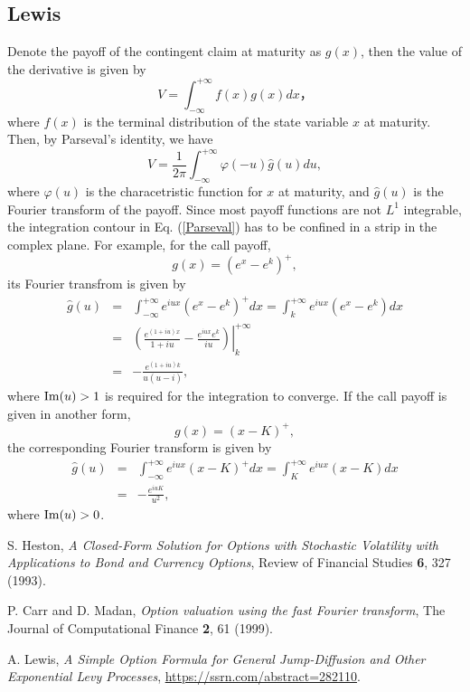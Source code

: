 \documentclass[12pt]{article}
\begin{document}
  \subsection{Lewis \cite{Lewis}}

    Denote the payoff of the contingent claim at maturity as $g(x)$, then the value of the derivative is given by
    \begin{equation}
      V = \int_{-\infty}^{+\infty}f(x)g(x)dx，
    \end{equation}
    where $f(x)$ is the terminal distribution of the state variable $x$ at maturity. Then, by Parseval's identity, we have
    \begin{equation}
      V = \frac{1}{2\pi}\int_{-\infty}^{+\infty}\varphi(-u)\hat{g}(u)du,
      \label{Parseval}
    \end{equation}
    where $\varphi(u)$ is the characetristic function for $x$ at maturity, and $\hat{g}(u)$ is the Fourier transform of
    the payoff. Since most payoff functions are not $L^1$ integrable, the integration contour in Eq. (\ref{Parseval}) has
    to be confined in a strip in the complex plane. For example, for the call payoff,
    \begin{equation}
      g(x)=\left(e^x-e^k\right)^+,
    \end{equation}
    its Fourier transfrom is given by
    \begin{eqnarray}
      \hat{g}(u) &=& \int_{-\infty}^{+\infty}e^{iux}\left(e^x-e^k\right)^+dx=\int_{k}^{+\infty}e^{iux}\left(e^x-e^k\right)dx \nonumber\\
                 &=& \left.\left(\frac{e^{(1+iu)x}}{1+iu}-\frac{e^{iux}e^k}{iu}\right)\right|_k^{+\infty}\nonumber\\
                 &=& -\frac{e^{(1+iu)k}}{u(u-i)},
    \end{eqnarray}
    where ${\rm Im}(u) > 1$ is required for the integration to converge. If the call payoff is given in another form,
    \begin{equation}
      g(x)=\left(x-K\right)^+,
    \end{equation}
    the corresponding Fourier transform is given by
    \begin{eqnarray}
      \hat{g}(u) &=& \int_{-\infty}^{+\infty}e^{iux}\left(x-K\right)^+dx=\int_{K}^{+\infty}e^{iux}\left(x-K\right)dx \nonumber\\
                 &=& -\frac{e^{iuK}}{u^2},
    \end{eqnarray}
    where ${\rm Im}(u) > 0$.


\begin{thebibliography}{99}
    S. Heston, {\it A Closed-Form Solution for Options with Stochastic Volatility with Applications to Bond and Currency Options}, Review of Financial Studies {\bf 6}, 327 (1993).

    P. Carr and D. Madan, {\it Option valuation using the fast Fourier transform}, The Journal of Computational Finance {\bf 2}, 61 (1999).

    A. Lewis, {\it A Simple Option Formula for General Jump-Diffusion and Other Exponential Levy Processes}, \url{https://ssrn.com/abstract=282110}.

\end{thebibliography}
\end{document}
